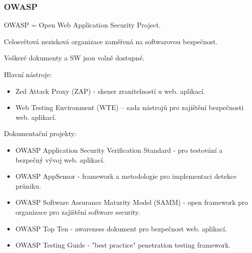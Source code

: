 \subsubsection{OWASP}
OWASP = Open Web Application Security Project.

Celosvětová nezisková organizace zaměřená na softwarovou bezpečnost.

Veškeré dokumenty a SW jsou volně dostupné.

Hlavní nástroje:
\begin{itemize}
    \item Zed Attack Proxy (ZAP) - skener zranitelností u web. aplikací.
    \item Web Testing Environment (WTE) – sada nástrojů pro zajištění bezpečnosti web. aplikací.
\end{itemize}

Dokumentační projekty:
\begin{itemize}
    \item OWASP Application Security Verification Standard - pro testování a bezpečný vývoj web. aplikací.
    \item OWASP AppSensor - framework a metodologie pro implementaci detekce průniku.
    \item OWASP Software Assurance Maturity Model (SAMM) - open framework pro organizace pro zajištění software security.
    \item OWASP Top Ten - awareness dokument pro bezpečnost web. aplikací.
    \item OWASP Testing Guide - "best practice" penetration testing framework.
\end{itemize}
